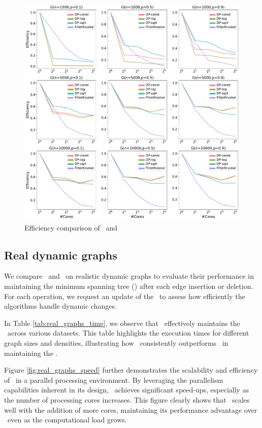         \begin{figure}
            \centering
            \includegraphics[width=1\linewidth]{figures/EfficiencyDPandFK.pdf}
            \caption{Efficiency comparison of \DPmst\ and \FKruskal}
            \label{fig:static:efficiency}
        \end{figure}
    \subsection*{Real dynamic graphs}
    We compare \DPmst\ and \FKruskal\ on realistic dynamic graphs to evaluate their performance in maintaining the minimum spanning tree (\mst) after each edge insertion or deletion. For each operation, we request an update of the \mst\ to assess how efficiently the algorithms handle dynamic changes.
    
    In Table \ref{tab:real_graphs_time}, we observe that \DPmst\ effectively maintains the \mst\ across various datasets. This table highlights the execution times for different graph sizes and densities, illustrating how \DPmst\ consistently outperforms \FKruskal\ in maintaining the \mst.

    Figure \ref{fig:real_graphs_speed} further demonstrates the scalability and efficiency of \DPmst\ in a parallel processing environment. By leveraging the parallelism capabilities inherent in its design, \DPmst\ achieves significant speed-ups, especially as the number of processing cores increases. This figure clearly shows that \DPmst\ scales well with the addition of more cores, maintaining its performance advantage over \FKruskal\ even as the computational load grows.

